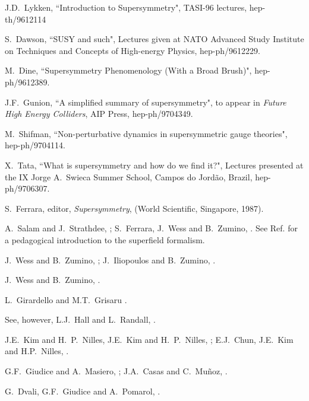 \begin{thebibliography}{99}
 J.D.~Lykken, ``Introduction to Supersymmetry",
TASI-96 lectures, hep-th/9612114

 S.~Dawson, ``SUSY and such",
Lectures given at NATO
Advanced Study Institute on Techniques and Concepts of High-energy
Physics,
hep-ph/9612229.

 M.~Dine, ``Supersymmetry Phenomenology
(With a Broad Brush)", hep-ph/9612389.

 J.F.~Gunion, ``A simplified summary of
supersymmetry", to appear in {\em Future High Energy Colliders},
AIP Press, hep-ph/9704349.

 M.~Shifman, ``Non-perturbative dynamics
in supersymmetric gauge theories", hep-ph/9704114.

X.~Tata, ``What is supersymmetry and how do we find it?",
Lectures presented at the IX Jorge A.~Swieca Summer School,
Campos do Jord\~ao, Brazil, hep-ph/9706307.

 S.~Ferrara, editor, {\em Supersymmetry},
(World Scientific, Singapore, 1987).

 A.~Salam and J.~Strathdee,
;  S.~Ferrara, J.~Wess and B.~Zumino,
.  See Ref.\cite{WessBaggerbook} for a
pedagogical introduction to the superfield formalism.

 J.~Wess and B.~Zumino,
; J.~Iliopoulos and B.~Zumino,
.

 J.~Wess and B.~Zumino,
.

 L.~Girardello and M.T.~Grisaru
.

 See, however, L.J.~Hall and L.~Randall,
.

J.E.~Kim and H.~P.~Nilles, 
J.E.~Kim and H.~P.~Nilles, ;
E.J.~Chun, J.E.~Kim and H.P.~Nilles, .

G.F.~Giudice and A.~Masiero, ;
J.A.~Casas and C.~Mu\~noz, .

 G.~Dvali, G.F.~Giudice and A.~Pomarol,
.


\end{thebibliography}

